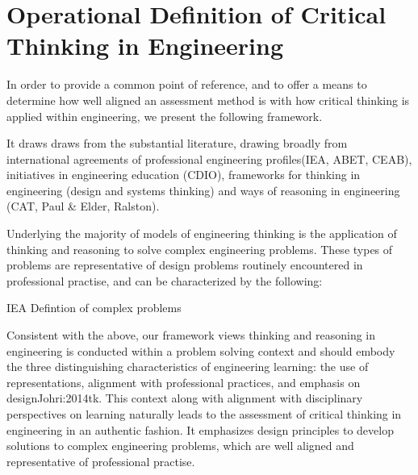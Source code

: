 \section{Operational Definition of Critical Thinking in Engineering}

In order to provide a common point of reference, and to offer a means to determine how well aligned an assessment method is with how critical thinking is applied within engineering, we present the following framework.  

It draws draws from the substantial literature, drawing broadly from international agreements of professional engineering profiles(IEA, ABET, CEAB), initiatives in engineering education (CDIO), frameworks for thinking in engineering (design and systems thinking) and ways of reasoning in engineering (CAT, Paul & Elder, Ralston). 

Underlying the majority of models of engineering thinking is the application of thinking and reasoning to solve complex engineering problems. These types of problems are representative of design problems routinely encountered in professional practise, and can be characterized by the following: 

{IEA Defintion of complex problems}

Consistent with the above, our framework views thinking and reasoning in engineering is conducted within a problem solving context and should embody the three distinguishing characteristics of engineering learning: the use of representations, alignment with professional practices, and emphasis on design{Johri:2014tk}. This context along with alignment with disciplinary perspectives on learning naturally leads to the assessment of critical thinking in engineering in an authentic fashion.  It emphasizes design principles to develop solutions to  complex engineering problems, which are well aligned and representative of professional practise.

